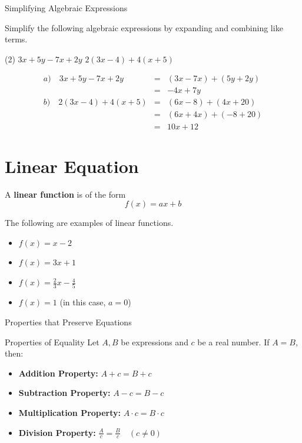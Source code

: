 \begin{frame}[t]{Simplifying Algebraic Expressions}
\begin{ex}
Simplify the following algebraic expressions by expanding and combining like terms.
\begin{tasks}(2)
\task $3x + 5y - 7x + 2y$
\task $2(3x - 4) + 4(x + 5)$
\end{tasks}
\end{ex}
\begin{sol}
\begin{eqnarray*}
a) \quad 3x + 5y - 7x + 2y &=& (3x - 7x) + (5y + 2y) \\
&=& -4x + 7y \\[6pt]
b) \quad 2(3x - 4) + 4(x + 5) &=& (6x - 8) + (4x + 20) \\
&=& (6x + 4x) + (-8 + 20) \\
&=& 10x + 12
\end{eqnarray*}
\end{sol}
\end{frame}

\section[Linear]{Linear Equation}
\frame{\sectionpage}

\begin{frame}
\begin{defn}{}{}
A \textbf{linear function} is of the form
\[ f(x) = ax + b \]
\end{defn}

\begin{ex}
The following are examples of linear functions.
\begin{itemize}
\item $f(x) = x-2$
\item $f(x) = 3x + 1$
\item $\displaystyle f(x) = \frac{2}{3} x - \frac{4}{5}$
\item $f(x) = 1$ (in this case, $a=0$)
\end{itemize}
\end{ex}
\end{frame}

\begin{frame}{Properties that Preserve Equations}
\begin{prop}{Properties of Equality}{}
Let $A, B$ be expressions and $c$ be a real number. If $A = B$, then:
\begin{itemize}
\item \textbf{Addition Property:} $A + c = B + c$
\item \textbf{Subtraction Property:} $A - c = B - c$
\item \textbf{Multiplication Property:} $A \cdot c = B \cdot c$
\item \textbf{Division Property:} $\frac{A}{c} = \frac{B}{c} \quad (c \neq 0)$
\end{itemize}
\end{prop}
\end{frame}

